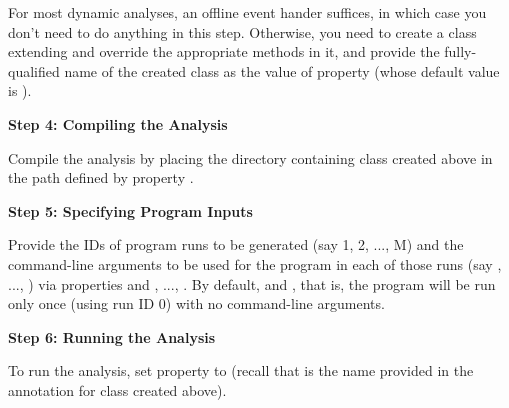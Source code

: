 For most dynamic analyses, an offline event hander suffices, in which case you don't need to do
anything in this step.
Otherwise, you need to create a class extending  and override the
appropriate methods in it, and provide the fully-qualified name of the created class as the value of property
 (whose default value is ).

{\bf Step 4: Compiling the Analysis}

Compile the analysis by placing the directory containing class  created
above in the path defined by property .

{\bf Step 5: Specifying Program Inputs}

Provide the IDs of program runs to be generated (say 1, 2, ..., M) and the command-line arguments to be
used for the program in each of those runs (say , ..., ) via properties
 and , ..., .
By default,  and , that is, the program will be run only
once (using run ID 0) with no command-line arguments.

{\bf Step 6: Running the Analysis}

To run the analysis, set property  to 
(recall that  is the name provided in the  annotation for class
 created above).

